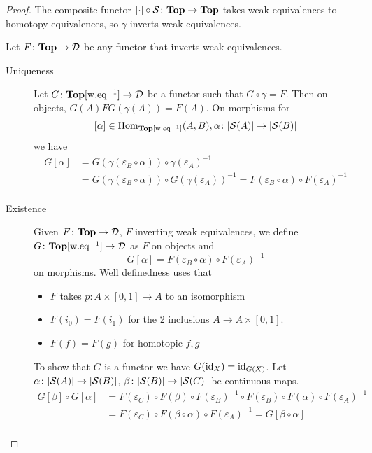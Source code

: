\documentclass[language=english]{TemplateLecture}
\begin{document}
\begin{proof}
    The composite functor \(\lvert\cdot\rvert\circ \mathcal{S} \colon \mathbf{Top} \to \mathbf{Top}\) takes weak equivalences to homotopy equivalences, so \(\gamma\) inverts weak equivalences.

    Let \(F\colon \mathbf{Top} \to \mathcal{D}\) be any functor that inverts weak equivalences.
    \begin{description}
        \item[Uniqueness] Let \(G\colon \mathbf{Top}[\mathrm{w.eq}^{-1}]\to \mathcal{D}\) be a functor such that \(G\circ \gamma = F\). Then on objects, \(G(A) F G(\gamma(A)) = F(A)\). On morphisms for
        \[[\alpha]\in \operatorname{Hom}_{\mathbf{Top}[\mathrm{w.eq}^{-1}]}(A,B), \alpha\colon \lvert\mathcal{S}(A)\rvert\to \lvert\mathcal{S}(B)\rvert\]
        we have
        \[\begin{split}
            G[\alpha] &= G(\gamma(\varepsilon_B \circ \alpha)) \circ \gamma(\varepsilon_A)^{-1} \\
            &= G(\gamma(\varepsilon_B\circ \alpha)) \circ G(\gamma(\varepsilon_A))^{-1} = F(\varepsilon_B\circ \alpha) \circ F(\varepsilon_A)^{-1} \\
        \end{split}\]
        \item[Existence] Given \(F\colon \mathbf{Top} \to \mathcal{D}\), \(F\) inverting weak equivalences, we define \(G\colon \mathbf{Top}[\mathrm{w.eq}^{-1}] \to \mathcal{D}\) as \(F\) on objects and
        \[G[\alpha] = F(\varepsilon_B \circ \alpha)\circ F(\varepsilon_A)^{-1}\]
        on morphisms. Well definedness uses that
        \begin{itemize}
            \item \(F\) takes \(p\colon A \times [0,1] \to A\) to an isomorphism
            \item \(F(i_0) = F(i_1)\) for the 2 inclusions \(A \to A\times [0,1]\).
            \item \(F(f) = F(g)\) for homotopic \(f,g\)
        \end{itemize}
        To show that \(G\) is a functor we have \(G(\operatorname{id}_X) = \operatorname{id}_{G(X)}\). Let \(\alpha\colon \lvert\mathcal{S}(A)\rvert\to \lvert\mathcal{S}(B)\rvert\), \(\beta\colon \lvert\mathcal{S}(B)\rvert\to \lvert\mathcal{S}(C)\rvert\) be continuous maps.
        \[\begin{split}
            G[\beta]\circ G[\alpha] &= F(\varepsilon_C) \circ F(\beta) \circ F(\varepsilon_B)^{-1} \circ F(\varepsilon_B) \circ F(\alpha) \circ F(\varepsilon_A)^{-1} \\
            &= F(\varepsilon_C) \circ F(\beta\circ \alpha) \circ F(\varepsilon_A)^{-1} = G[\beta\circ \alpha]\\
        \end{split}\]
    \end{description}
\end{proof}
\end{document}
